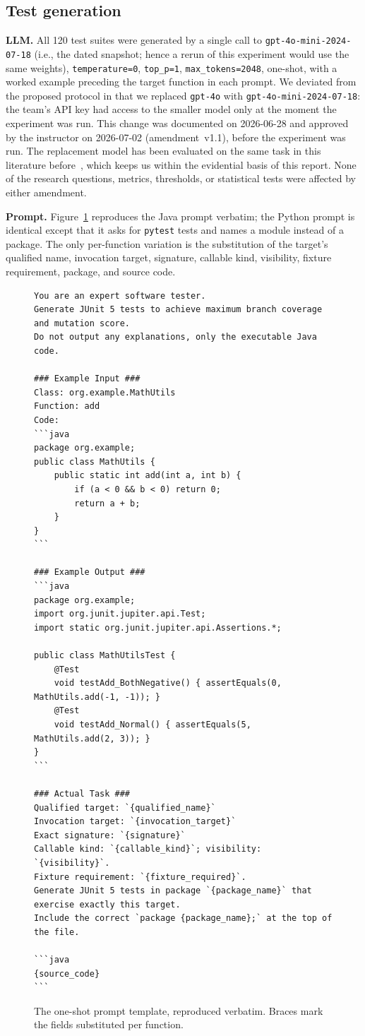\subsection{Test generation}
\textbf{LLM.} All 120 test suites were generated by a single call to
\texttt{gpt-4o-mini-2024-07-18} (i.e., the dated snapshot; hence a rerun of this
experiment would use the same weights), \texttt{temperature=0}, \texttt{top\_p=1},
\texttt{max\_tokens=2048}, one-shot, with a worked example preceding the target function
in each prompt. We deviated from the proposed protocol in that we replaced \texttt{gpt-4o}
with \texttt{gpt-4o-mini-2024-07-18}: the team's API key had access to the smaller model only
at the moment the experiment was run. This change was documented on 2026-06-28 and approved by
the instructor on 2026-07-02 (amendment~v1.1), before the experiment was run. The replacement
model has been evaluated on the same task in this literature
before~\cite{konstantinou2026evaluating}, which keeps us within the evidential basis of this
report. None of the research questions, metrics, thresholds, or statistical tests were
affected by either amendment.

\textbf{Prompt.} Figure~\ref{fig:prompt} reproduces the Java prompt verbatim; the Python
prompt is identical except that it asks for \texttt{pytest} tests and names a module instead
of a package. The only per-function variation is the substitution of the target's qualified
name, invocation target, signature, callable kind, visibility, fixture requirement, package,
and source code.

\begin{figure}[t]
\begin{lstlisting}
You are an expert software tester.
Generate JUnit 5 tests to achieve maximum branch coverage and mutation score.
Do not output any explanations, only the executable Java code.

### Example Input ###
Class: org.example.MathUtils
Function: add
Code:
```java
package org.example;
public class MathUtils {
    public static int add(int a, int b) {
        if (a < 0 && b < 0) return 0;
        return a + b;
    }
}
```

### Example Output ###
```java
package org.example;
import org.junit.jupiter.api.Test;
import static org.junit.jupiter.api.Assertions.*;

public class MathUtilsTest {
    @Test
    void testAdd_BothNegative() { assertEquals(0, MathUtils.add(-1, -1)); }
    @Test
    void testAdd_Normal() { assertEquals(5, MathUtils.add(2, 3)); }
}
```

### Actual Task ###
Qualified target: `{qualified_name}`
Invocation target: `{invocation_target}`
Exact signature: `{signature}`
Callable kind: `{callable_kind}`; visibility: `{visibility}`.
Fixture requirement: `{fixture_required}`.
Generate JUnit 5 tests in package `{package_name}` that exercise exactly this target.
Include the correct `package {package_name};` at the top of the file.

```java
{source_code}
```
\end{lstlisting}
\caption{The one-shot prompt template, reproduced verbatim. Braces mark the fields
substituted per function.}
\label{fig:prompt}
\end{figure}

